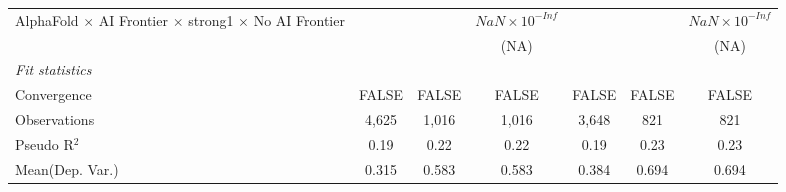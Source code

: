 \begin{tabular}{lcccccc}
   AlphaFold $\times$ AI Frontier $\times$ strong1 $\times$ No AI Frontier    &                        &                        & $NaN\times 10^{-Inf}$  &                        &                        & $NaN\times 10^{-Inf}$\\    
                                                                              &                        &                        & (NA)                   &                        &                        & (NA)\\   
   \midrule
   \emph{Fit statistics}\\
   Convergence                                                                &FALSE                   & FALSE                  & FALSE                  & FALSE                  & FALSE                  & FALSE\\  
   Observations                                                               & 4,625                  & 1,016                  & 1,016                  & 3,648                  & 821                    & 821\\  
   Pseudo R$^2$                                                               & 0.19                   & 0.22                   & 0.22                   & 0.19                   & 0.23                   & 0.23\\  
Mean(Dep. Var.) & 0.315 & 0.583 & 0.583 & 0.384 & 0.694 & 0.694 \\
   

\end{tabular}
